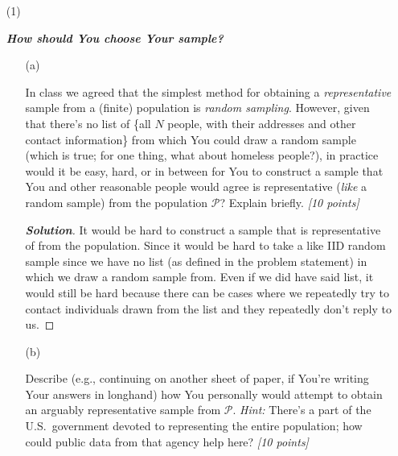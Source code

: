 \documentclass[12pt]{article}
\newenvironment{solution}{\begin{proof}[\textbf{\textit{Solution}}] }{\end{proof}}
\begin{document}
\begin{itemize}
\item[(1)]

\textbf{\textit{How should You choose Your sample?}}

\begin{itemize}

\item[(a)]

In class we agreed that the simplest method for obtaining a \textit{representative} sample from a (finite) population is \textit{random sampling}. However, given that there's no list of \{all $N$ people, with their addresses and other contact information\} from which You could draw a random sample (which is true; for one thing, what about homeless people?), in practice would it be easy, hard, or in between for You to construct a sample that You and other reasonable people would agree is representative (\textit{like} a random sample) from the population $\mathcal{ P }$? Explain briefly. \textit{[10 points]} 
\begin{tcolorbox}
    \begin{solution}
        It would be hard to construct a sample that is representative of from the population. Since it would be hard to take a like IID random sample since we have no list (as defined in the problem statement) in which we draw a random sample from. Even if we did have said list, it would still be hard because there can be cases where we repeatedly try to contact individuals drawn from the list and they repeatedly don't reply to us.  
    \end{solution}
\end{tcolorbox}


\vspace*{1.0in}

\item[(b)]

Describe (e.g., continuing on another sheet of paper, if You're writing Your answers in longhand) how You personally would attempt to obtain an arguably representative sample from $\mathcal{ P }$. \textit{Hint:} There's a part of the U.S.~government devoted to representing the entire population; how could public data from that agency help here? \textit{[10 points]}

\end{itemize}

\vspace*{0.8in}

\end{itemize}
\end{document}
